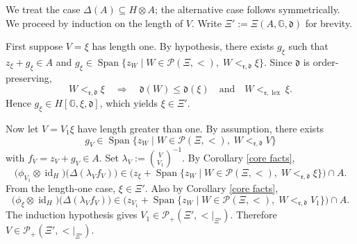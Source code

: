 \documentclass{article}
\makeatletter
\renewenvironment{proof}[1][\proofname]{\par
	\pushQED{\qed}%
	\normalfont \topsep6\p@\@plus6\p@\relax
	\trivlist
	\item[\hskip\labelsep
	\bfseries
	#1\@addpunct{.}]\ignorespaces
}{%
	\popQED\endtrivlist\@endpefalse
}
\theoremstyle{plain}
\theoremstyle{definition}
\numberwithin{equation}{section}
\DeclareMathOperator{\id}{id}
\DeclareMathOperator{\Span}{Span}
\DeclareMathOperator{\lex}{lex}
\newcommand{\GG}{\mathbb{G}}
\newcommand{\dd}{\mathfrak{d}}
\newcommand{\rr}{\mathfrak{r}}
\makeatother
\begin{document}
	\begin{proof}
		We treat the case $\Delta(A) \subseteq H\otimes A$; the alternative case follows symmetrically. We proceed by induction on the length of $V$. Write $\Xi':=\Xi(A,\GG,\dd)$ for brevity.
		
		First suppose $V=\xi$ has length one. By hypothesis, there exists $g_{\xi}$ such that $z_{\xi} +g_{\xi} \in A$ and
		$g_{\xi}\in \Span\{z_{W} \mid W\in \mathcal{P}(\Xi, <),\; W<_{\rr,\dd} \xi\}.$
		Since $\dd$ is order-preserving,
		\[
		W<_{\rr,\dd} \xi \quad \Longrightarrow \quad \dd(W) \leq \dd(\xi) \quad \text{and} \quad W<_{\rr,\lex} \xi.
		\]
		Hence $g_{\xi}\in H[\GG, \xi, \dd]$, which yields $\xi\in \Xi'$.
		
		Now let $V=V_{1} \xi$ have length greater than one. By assumption, there exists $$g_{V}\in \Span\{z_{W} \mid W\in \mathcal{P}(\Xi, <),\; W<_{\rr,\dd} V\}$$
		with $f_{V}=z_{V} +g_{V} \in A$.
		Set $\lambda_{V}:=\binom{V}{V_{1}}^{-1}$. By Corollary \ref{core facts},
		\[
		\big(\phi_{V_{1}} \otimes \id_{H} \big) \big (\Delta(\lambda_{V} f_{V})\big) \in \Big(  z_{\xi} + \Span \{z_{W} \mid W\in \mathcal{P}(\Xi, <),\; W<_{\rr,\dd} \xi\} \Big) \cap A.
		\]
		From the length-one case, $\xi \in \Xi'$. Also by Corollary \ref{core facts},
		\[
		\big(\phi_{\xi} \otimes \id_{H} \big) \big (\Delta(\lambda_{V} f_{V})\big) \in  \Big(  z_{V_{1}} + \Span \{z_{W} \mid W\in \mathcal{P}(\Xi, <),\; W<_{\rr,\dd} V_{1}\} \Big) \cap A.
		\]
		The induction hypothesis gives $V_{1}\in \mathcal{P}_{+}(\Xi', {<}|_{\Xi'})$. Therefore $V\in \mathcal{P}_{+}(\Xi', {<}|_{\Xi'})$.
	\end{proof}
	
\end{document}
